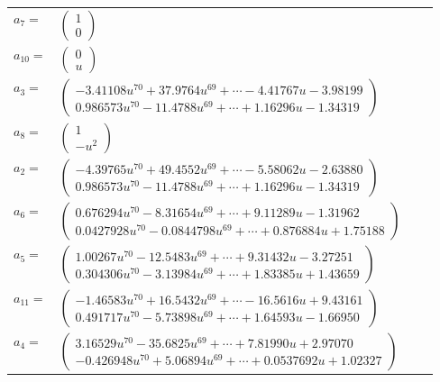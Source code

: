 \documentclass[1p]{elsarticle_modified}
\theoremstyle{definition}
\begin{document}
\begin{tabular}{m{7pt} m{180pt} m{7pt} m{180pt} }
\flushright $a_{7}=$&$\begin{pmatrix}1\\0\end{pmatrix}$ \\
\flushright $a_{10}=$&$\begin{pmatrix}0\\u\end{pmatrix}$ \\
\flushright $a_{3}=$&$\begin{pmatrix}-3.41108 u^{70}+37.9764 u^{69}+\cdots-4.41767 u-3.98199\\0.986573 u^{70}-11.4788 u^{69}+\cdots+1.16296 u-1.34319\end{pmatrix}$ \\
\flushright $a_{8}=$&$\begin{pmatrix}1\\- u^2\end{pmatrix}$ \\
\flushright $a_{2}=$&$\begin{pmatrix}-4.39765 u^{70}+49.4552 u^{69}+\cdots-5.58062 u-2.63880\\0.986573 u^{70}-11.4788 u^{69}+\cdots+1.16296 u-1.34319\end{pmatrix}$ \\
\flushright $a_{6}=$&$\begin{pmatrix}0.676294 u^{70}-8.31654 u^{69}+\cdots+9.11289 u-1.31962\\0.0427928 u^{70}-0.0844798 u^{69}+\cdots+0.876884 u+1.75188\end{pmatrix}$ \\
\flushright $a_{5}=$&$\begin{pmatrix}1.00267 u^{70}-12.5483 u^{69}+\cdots+9.31432 u-3.27251\\0.304306 u^{70}-3.13984 u^{69}+\cdots+1.83385 u+1.43659\end{pmatrix}$ \\
\flushright $a_{11}=$&$\begin{pmatrix}-1.46583 u^{70}+16.5432 u^{69}+\cdots-16.5616 u+9.43161\\0.491717 u^{70}-5.73898 u^{69}+\cdots+1.64593 u-1.66950\end{pmatrix}$ \\
\flushright $a_{4}=$&$\begin{pmatrix}3.16529 u^{70}-35.6825 u^{69}+\cdots+7.81990 u+2.97070\\-0.426948 u^{70}+5.06894 u^{69}+\cdots+0.0537692 u+1.02327\end{pmatrix}$ \\

\end{tabular}
\end{document}
